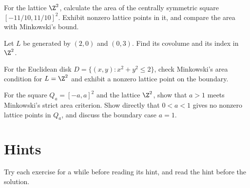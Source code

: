 \begin{exercise}[$\star$]\label{ex:v13-extra-05-1}
For the lattice $\Z^2$, calculate the area of the centrally symmetric square $[-11/10,11/10]^2$. Exhibit nonzero lattice points in it, and compare the area with Minkowski's bound.
\end{exercise}

\begin{exercise}[$\star$]\label{ex:v13-extra-05-2}
Let $L$ be generated by $(2,0)$ and $(0,3)$. Find its covolume and its index in $\Z^2$.
\end{exercise}

\begin{exercise}[$\star\star$]\label{ex:v13-extra-05-3}
For the Euclidean disk $D=\{(x,y):x^2+y^2\le2\}$, check Minkowski's area condition for $L=\Z^2$ and exhibit a nonzero lattice point on the boundary.
\end{exercise}

\begin{exercise}[$\star\star\star$]\label{ex:v13-extra-05-4}
For the square $Q_a=[-a,a]^2$ and the lattice $\Z^2$, show that $a>1$ meets Minkowski's strict area criterion. Show directly that $0<a<1$ gives no nonzero lattice points in $Q_a$, and discuss the boundary case $a=1$.
\end{exercise}

\section{Hints}

Try each exercise for a while before reading its hint, and read the hint before the solution.

